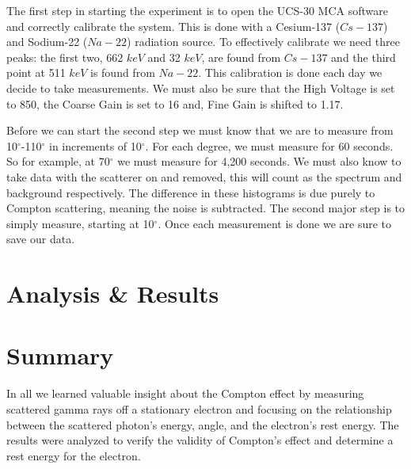 \documentclass[a4paper,12pt,english]{all-in-one} %
\begin{document}
\begin{multicols}{2}
{The first step in starting the experiment is to open the UCS-30 MCA software and correctly calibrate the system. This is done with a Cesium-137 ($Cs-137$) and Sodium-22 ($Na-22$) radiation source. To effectively calibrate we need three peaks: the first two, 662 $keV$ and 32 $keV$, are found from $Cs-137$ and the third point at 511 $keV$ is found from $Na-22$. This calibration is done each day we decide to take measurements. We must also be sure that the High Voltage is set to 850, the Coarse Gain is set to 16 and, Fine Gain is shifted to 1.17.

Before we can start the second step we must know that we are to measure from 10$^\circ$-110$^\circ$ in increments of 10$^\circ$. For each degree, we must measure for 60 seconds. So for example, at 70$^\circ$ we must measure for 4,200 seconds. We must also know to take data with the scatterer on and removed, this will count as the spectrum and background respectively. The difference in these histograms is due purely to Compton scattering, meaning the noise is subtracted. The second major step is to simply measure, starting at 10$^\circ$. Once each measurement is done we are sure to save our data.  
}

\section*{Analysis \& Results}
{

}
\end{multicols}

\section*{Summary}
{
 In all we learned valuable insight about the Compton effect by measuring scattered gamma rays off a stationary electron and focusing on the relationship between the scattered photon’s energy, angle, and the electron’s rest energy. The results were analyzed to verify the validity of Compton's effect and determine a rest energy for the electron.
}
\end{document}

